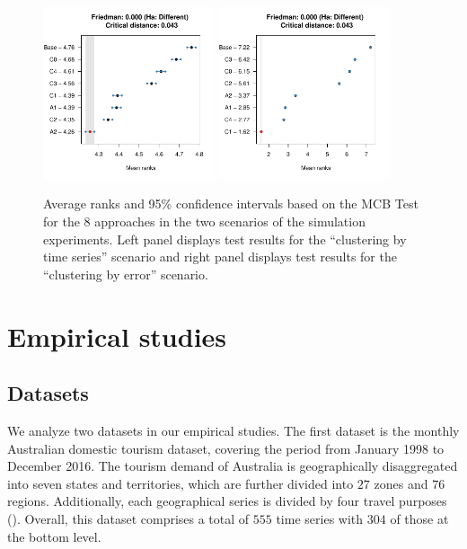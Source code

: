 \documentclass[a4paper,review,12pt,authoryear]{elsarticle}
\begin{document}
\begin{figure}
    \centering
    \includegraphics[width=0.45\textwidth]{figures/simu_mcb1.pdf}
    \includegraphics[width=0.45\textwidth]{figures/simu_mcb2.pdf}
    \caption{\label{fig:simu_mcb}Average ranks and 95\% confidence intervals based on the MCB Test for the $8$ approaches in the two scenarios of the simulation experiments. Left panel displays test results for the ``clustering by time series'' scenario and right panel displays test results for the ``clustering by error'' scenario.}
\end{figure}

\section{Empirical studies}
\label{sec:emp}
\subsection{Datasets}

We analyze two datasets in our empirical studies. The first dataset is the monthly Australian domestic tourism dataset, covering the period from January 1998 to December 2016. The tourism demand of Australia is geographically disaggregated into seven states and territories, which are further divided into $27$ zones and $76$ regions. Additionally, each geographical series is divided by four travel purposes (\citealp{wickramasuriyaOptimalForecastReconciliation2019}). Overall, this dataset comprises a total of $555$ time series with $304$ of those at the bottom level.
\end{document}
